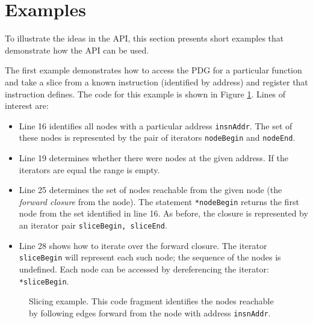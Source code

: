 \documentclass[12pt,titlepage]{article}
\begin{document}
\section{Examples} 

To illustrate the ideas in the API, this section presents
short examples that demonstrate how the API can be used.  

The first example demonstrates how to access the PDG for a particular
function and take a slice from a known instruction (identified by
address) and register that instruction defines. The code for this
example is shown in Figure \ref{example1}. Lines of interest are:
\begin{itemize}
\item Line 16 identifies all nodes with a particular address
  \texttt{insnAddr}. The set of these nodes is represented by the pair
  of iterators \texttt{nodeBegin} and \texttt{nodeEnd}.
\item Line 19 determines whether there were nodes at the given
  address. If the iterators are equal the range is empty.
\item Line 25 determines the set of nodes reachable from the given
  node (the \emph{forward closure} from the node). The statement
  \texttt{*nodeBegin} returns the first node from the set identified
  in line 16. As before, the closure is represented by an iterator
  pair \texttt{sliceBegin, sliceEnd}. 
\item Line 28 shows how to iterate over the forward closure. The
  iterator \texttt{sliceBegin} will represent each such node; the
  sequence of the nodes is undefined. Each node can be accessed by
  dereferencing the iterator: \texttt{*sliceBegin}.
\end{itemize}

\begin{figure}

\caption{Slicing example. This code fragment identifies the nodes
  reachable by following edges forward from the node with address
  \texttt{insnAddr}.}
\label{example1}
\end{figure}
\end{document}
